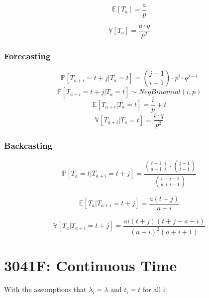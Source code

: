 \begin{equation*}
    \mathbb{E}[T_a] = \frac{a}{p}
\end{equation*}

\begin{equation*}
    \mathbb{V}[T_a] = \frac{a \cdot q}{p^2}
\end{equation*}


\subsubsection{Forecasting}
\begin{equation*}
    \mathbb{P}[T_{a + i} = t + j | T_a = t] =
    \binom{j-1}{i-1} \cdot p^i \cdot q^{j-i}
\end{equation*}
\begin{equation*}
    \mathbb{P}[T_{a + i} = t + j | T_a = t] \sim NegBinomial(i, p)
\end{equation*}
\begin{equation*}
    \mathbb{E}[T_{a + i} | T_a = t] = \frac{i}{p} + t
\end{equation*}
\begin{equation*}
    \mathbb{V}[T_{a + i} | T_a = t] = \frac{i \cdot q}{p^2}
\end{equation*}

\subsubsection{Backcasting}
\begin{equation*}
    \mathbb{P}[T_a = t | T_{a + i} = t + j] =
    \frac{
        \binom{t - 1}{a - 1} \cdot \binom{j - 1}{i - 1}
        }{
        \binom{t + j - 1}{a + i - 1}
    }
\end{equation*}

\begin{equation*}
    \mathbb{E}[T_a | T_{a + i} = t + j] = \frac{a (t + j)}{ a + i }
\end{equation*}


\begin{equation*}
    \mathbb{V}[T_a | T_{a + i} = t + j] = 
    \frac{
        a i (t + j) (t + j - a - i)
        }{
        (a + i)^2 (a + i + 1)
    }
\end{equation*}
\section{3041F: Continuous Time}
With the assumptions that \(\lambda_i = \lambda\) and \(t_i = t\) for all i:


